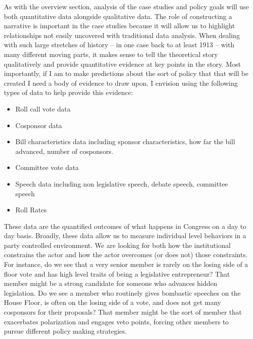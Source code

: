 \documentclass[12pt]{article}
\begin{document}
As with the overview section, analysis of the case studies and policy goals will use both quantitative data alongside qualitative data. The role of constructing a narrative is important in the case studies because it will allow us to highlight relationships not easily uncovered with traditional data analysis. When dealing with such large stretches of history -- in one case back to at least 1913 -- with many different moving parts, it makes sense to tell the theoretical story qualitatively and provide quantitative evidence at key points in the story. Most importantly, if I am to make predictions about the sort of policy that that will be created I need a body of evidence to draw upon. I envision using the following types of data to help provide this evidence:
\begin{itemize}
\setlength{\itemsep}{-5pt}
\item Roll call vote data
\item Cosponsor data
\item Bill characteristics data including sponsor characteristics, how far the bill advanced, number of cosponsors.
\item Committee vote data
\item Speech data including non legislative speech, debate speech, committee speech
\item Roll Rates
\end{itemize}
These data are the quantified outcomes of what happens in Congress on a day to day basis. Broadly, these data allow us to measure individual level behaviors in a party controlled environment. We are looking for both how the institutional constrains the actor and how the actor overcomes (or does not) those constraints. For instance, do we see that a very senior member is rarely on the losing side of a floor vote and has high level traits of being a legislative entrepreneur? That member might be a strong candidate for someone who advances hidden legislation. Do we see a member who routinely gives bombastic speeches on the House Floor, is often on the losing side of a vote, and does not get many cosponsors for their proposals? That member might be the sort of member that exacerbates polarization and engages veto points, forcing other members to pursue different policy making strategies.
\end{document}
